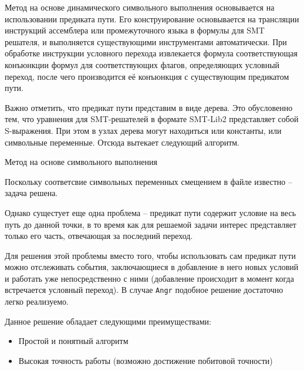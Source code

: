 Метод на основе динамического символьного выполнения основывается на использовании предиката пути.
Его конструирование основывается на трансляции инструкций ассемблера или промежуточного языка в формулы для SMT решателя, и выполняется существующими инструментами автоматически.
При обработке инструкции условного перехода извлекается формула соответствующая конъюнкции формул для соответствующих флагов, определяющих условный переход, после чего производится её конъюнкция с существующим предикатом пути.

Важно отметить, что предикат пути представим в виде дерева. Это обусловенно тем, что уравнения для SMT-решателей в формате SMT-Lib2 представляет собой S-выражения. При этом в узлах дерева могут находиться или константы, или символьные переменные. Отсюда вытекает следующий алгоритм.
\bigskip

\begin{algorithm}[H]
\SetAlgoLined
{}
  \caption{Метод на основе символьного выполнения}
\end{algorithm}

\bigskip
Поскольку соответсвие символьных переменных смещением в файле известно -- задача решена.

Однако сущестует еще одна проблема -- предикат пути содержит условие на весь путь до данной точки, в то время как для решаемой задачи интерес представляет только его часть, отвечающая за последний переход.


Для решения этой проблемы вместо того, чтобы использовать сам предикат пути можно отслеживать события, заключающиеся в добавление в него новых условий и работать уже непосредственно с ними (добавление происходит в момент когда встречается условный переход). В случае \texttt{Angr} подобное решение достаточно легко реализуемо.

Данное решение обладает следующими преимуществами:
  \begin{itemize}
    \item Простой и понятный алгоритм
    \item Высокая точность работы (возможно достижение побитовой точности)
  \end{itemize}

